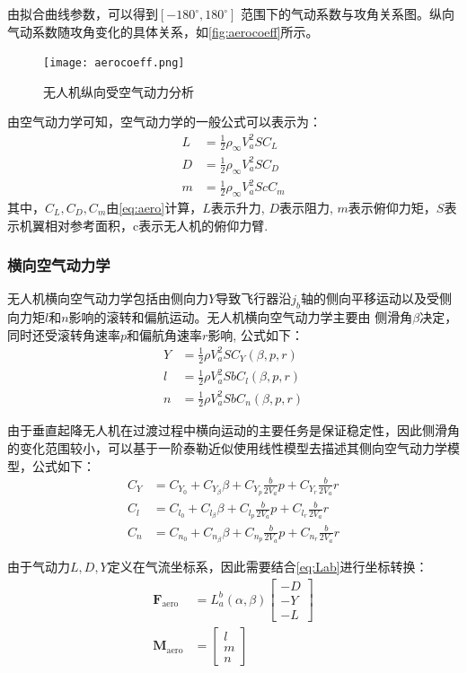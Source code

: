 由拟合曲线参数，可以得到$\left [-180^\circ, 180^\circ \right ]$ 范围下的气动系数与攻角关系图。纵向气动系数随攻角变化的具体关系，如\autoref{fig:aerocoeff}所示。
\begin{figure}[htbp]
    \centering
    \texttt{[image: aerocoeff.png]}
    \caption{\label{fig:aerocoeff}无人机纵向受空气动力分析}
\end{figure}

由空气动力学可知，空气动力学的一般公式可以表示为：
\begin{align}
    L & =\frac{1}{2} \rho_{\infty} V_{a}^{2} S C_{L} \\
    D & =\frac{1}{2} \rho_{\infty} V_{a}^{2} S C_{D} \\
    m & =\frac{1}{2} \rho_{\infty} V_{a}^{2} S c C_{m}
\end{align}
其中，$C_{L},C_{D},C_{m}$由\autoref{eq:aero}计算，$L$表示升力, $D$表示阻力, $m$表示俯仰力矩，$S$表示机翼相对参考面积，c表示无人机的俯仰力臂.
\subsubsection{横向空气动力学}
无人机横向空气动力学包括由侧向力$Y$导致飞行器沿$j_{b}$轴的侧向平移运动以及受侧向力矩$l$和$n$影响的滚转和偏航运动。无人机横向空气动力学主要由
侧滑角$\beta$决定，同时还受滚转角速率$p$和偏航角速率$r$影响, 公式如下：
\begin{align}
    Y & = \frac{1}{2} \rho V_{a}^{2} S C_{Y}\left(\beta, p, r\right) \\
    l & = \frac{1}{2} \rho V_{a}^{2} S b C_{l}\left(\beta, p, r\right) \\
    n & = \frac{1}{2} \rho V_{a}^{2} S b C_{n}\left(\beta, p, r\right)
\end{align}

由于垂直起降无人机在过渡过程中横向运动的主要任务是保证稳定性，因此侧滑角的变化范围较小，可以基于一阶泰勒近似使用线性模型去描述其侧向空气动力学模型，公式如下：
\begin{align}
    C_{Y} & = C_{Y_{0}}+C_{Y_{\beta}} \beta+C_{Y_{p}} \frac{b}{2 V_{a}} p+C_{Y_{r}} \frac{b}{2 V_{a}}r\\
    C_{l} & = C_{l_{0}}+C_{l_{\beta}} \beta+C_{l_{p}} \frac{b}{2 V_{a}} p+C_{l_{r}} \frac{b}{2 V_{a}} r\\
    C_{n} & = C_{n_{0}}+C_{n_{\beta}} \beta+C_{n_{p}} \frac{b}{2 V_{a}} p+C_{n_{r}} \frac{b}{2 V_{a}} r
\end{align}

由于气动力$L,D,Y$定义在气流坐标系，因此需要结合\autoref{eq:Lab}进行坐标转换：
\begin{align}
    \mathbf{F}_{\text {aero}} & = L_{a}^{b}(\alpha ,\beta)\begin{bmatrix}
    -D\\
    -Y\\
-L
\end{bmatrix}\\
\mathbf{M}_{\text {aero}} & = \begin{bmatrix}
    l\\
    m\\
n
\end{bmatrix}
    \end{align}
